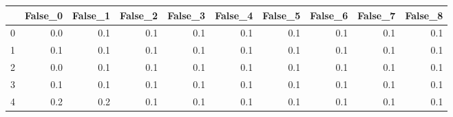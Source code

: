 \begin{tabular}{lrrrrrrrrr}
\toprule
{} &  False\_0 &  False\_1 &  False\_2 &  False\_3 &  False\_4 &  False\_5 &  False\_6 &  False\_7 &  False\_8 \\ \hline
\midrule
0 &      0.0 &      0.1 &      0.1 &      0.1 &      0.1 &      0.1 &      0.1 &      0.1 &      0.1 \\ \hline
1 &      0.1 &      0.1 &      0.1 &      0.1 &      0.1 &      0.1 &      0.1 &      0.1 &      0.1 \\ \hline
2 &      0.0 &      0.1 &      0.1 &      0.1 &      0.1 &      0.1 &      0.1 &      0.1 &      0.1 \\ \hline
3 &      0.1 &      0.1 &      0.1 &      0.1 &      0.1 &      0.1 &      0.1 &      0.1 &      0.1 \\ \hline
4 &      0.2 &      0.2 &      0.1 &      0.1 &      0.1 &      0.1 &      0.1 &      0.1 &      0.1 \\ \hline
\bottomrule
\end{tabular}
